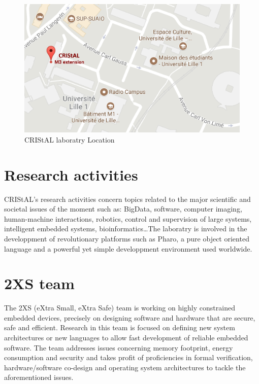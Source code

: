\begin{figure}[!ht]
	\centering
	\includegraphics[scale=0.4 , frame]{img/cristalLocation.png} 
	\caption{CRIStAL laboratry Location}
\end{figure}


\section{Research activities}

CRIStAL's research activities concern topics related to the major scientific and societal issues of the moment such as: BigData, software, computer imaging, human-machine interactions, robotics, control and supervision of large systems, intelligent embedded systems, bioinformatics\dots The laboratry is involved in the developpment of revolutionary platforms such as Pharo, a pure object oriented language and a powerful yet simple developpment environment used worldwide.

\section{2XS team}

The 2XS (eXtra Small, eXtra Safe) team is working on highly constrained embedded devices, precisely on designing software and hardware that are secure, safe and efficient. Research in this team is focused on defining new system architectures or new languages to allow fast development of reliable embedded software. The team addresses issues concerning memory footprint, energy consumption and security and takes profit of proficiencies in formal verification, hardware/software co-design and operating system architectures to tackle the aforementioned issues.\\

